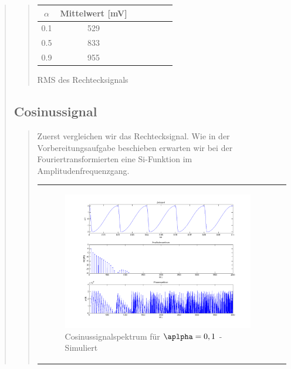 \begin{quote}
\begin{quote}
            \hspace{-4em}
                  \begin{tabular}{|c|c|c|c|c|c|c|}
                  \hline
                   $\alpha $ &  Mittelwert [mV] \\ \hline 
                   0.1 &  529 \\ \hline
                   0.5 &  833 \\ \hline
                   0.9 &  955 \\ \hline           
                 \end{tabular}
                       \caption{RMS des Rechtecksignals}
                        \label{tablelabel1}
        
    \end{quote}
    
    \subsection{Cosinussignal}
    \begin{quote}
        Zuerst vergleichen wir das Rechtecksignal. Wie in der Vorbereitungsaufgabe beschieben erwarten wir bei der
        Fouriertransformierten eine Si-Funktion im Amplitudenfrequenzgang.
        
            \begin{center}
            \begin{tabular}{ll}
            
            \hspace{-12em}
                \begin{minipage}{0.6\textwidth}
                    
                    \begin{figure}[H]
                        \label{fig:}            
                        \includegraphics[scale=0.25]{./Bilder/cos_alpha1.png} %
                        \caption{Cosinussignalspektrum für $\aplpha = 0,1$ - Simuliert}
                    \end{figure}
                    

\end{minipage}
\end{tabular}
\end{center}
\end{quote}
\end{quote}
